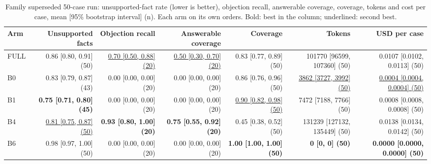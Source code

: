 \begin{table}[htbp]
\centering\footnotesize
\begin{adjustbox}{max width=\textwidth}
\begin{tabular}{@{}lrrrrrr@{}}
\toprule
Arm & Unsupported facts & Objection recall & Answerable coverage & Coverage & Tokens & USD per case \\
\midrule
FULL & 0.86 [0.80, 0.91] (50) & \underline{0.70 [0.50, 0.88] (20)} & \underline{0.50 [0.30, 0.70] (20)} & 0.83 [0.77, 0.89] (50) & 101770 [96599, 107360] (50) & 0.0107 [0.0102, 0.0113] (50) \\
B0 & 0.83 [0.79, 0.87] (43) & 0.00 [0.00, 0.00] (20) & 0.00 [0.00, 0.00] (20) & 0.86 [0.76, 0.96] (50) & \underline{3862 [3727, 3992] (50)} & \underline{0.0004 [0.0004, 0.0004] (50)} \\
B1 & \textbf{0.75 [0.71, 0.80] (45)} & 0.00 [0.00, 0.00] (20) & 0.00 [0.00, 0.00] (20) & \underline{0.90 [0.82, 0.98] (50)} & 7472 [7188, 7766] (50) & 0.0008 [0.0008, 0.0008] (50) \\
B4 & \underline{0.81 [0.75, 0.87] (50)} & \textbf{0.93 [0.80, 1.00] (20)} & \textbf{0.75 [0.55, 0.92] (20)} & 0.45 [0.38, 0.52] (50) & 131239 [127132, 135449] (50) & 0.0138 [0.0134, 0.0142] (50) \\
B6 & 0.98 [0.97, 1.00] (50) & 0.00 [0.00, 0.00] (20) & 0.00 [0.00, 0.00] (20) & \textbf{1.00 [1.00, 1.00] (50)} & \textbf{0 [0, 0] (50)} & \textbf{0.0000 [0.0000, 0.0000] (50)} \\
\bottomrule
\end{tabular}
\end{adjustbox}
\caption{Family superseded 50-case run: unsupported-fact rate (lower is better), objection recall, answerable coverage, coverage, tokens and cost per case, mean [95\% bootstrap interval] (n). Each arm on its own orders. Bold: best in the column; underlined: second best.}
\label{tab:table1b_v1}
\end{table}